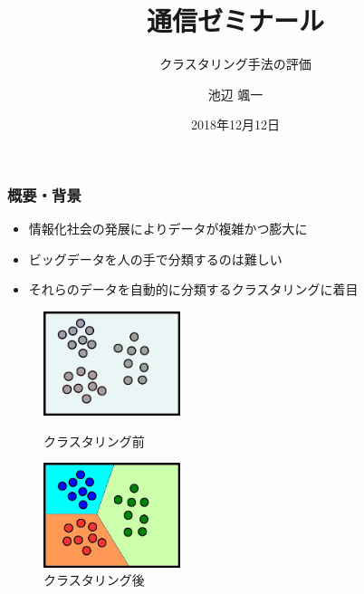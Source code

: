 \documentclass[13pt,dvipdfmx]{beamer}
\title{通信ゼミナール}
\subtitle{クラスタリング手法の評価}
\author{池辺 颯一}
\institute{芝浦工業大学 工学部 通信工学科}
\date{2018年12月12日}
\begin{document}
\begin{frame}\frametitle{}
 \titlepage
\end{frame}

\begin{frame}\frametitle{概要・背景}
\begin{itemize}
 \item 情報化社会の発展によりデータが複雑かつ膨大に
 \item ビッグデータを人の手で分類するのは難しい
 \item それらのデータを自動的に分類するクラスタリングに着目
\end{itemize}
\vspace{5mm}
\begin{figure}[htbp]
 \begin{minipage}{0.4\hsize}
  \begin{center}
   \includegraphics[width=40mm]{before_clustering.png}
  \end{center}
  \captionsetup{labelformat=empty,labelsep=none}
  \caption{クラスタリング前}
  \label{fig:one}
 \end{minipage}
\hspace{1cm}
 \begin{minipage}{0.4\hsize}
  \begin{center}
   \includegraphics[width=40mm]{after_clustering.png}
  \end{center}
  \captionsetup{labelformat=empty,labelsep=none}
  \caption{クラスタリング後}
  \label{fig:two}
 \end{minipage}
\end{figure}
\end{frame}
\end{document}
